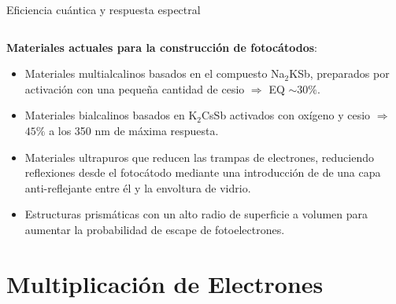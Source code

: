 \documentclass[a4paper,10pt]{beamer}
\begin{document}
\begin{frame}[allowframebreaks]{Eficiencia cuántica y respuesta espectral}
\begin{justify}
\begin{columns}[c]
  \end{columns}

  \framebreak
  
  \textbf{Materiales actuales para la construcción de fotocátodos}:
  
  \begin{itemize}
   \item \begin{justify}Materiales multialcalinos basados en el compuesto Na$_2$KSb,
   preparados por activación con una pequeña cantidad de cesio 
   $\Rightarrow$ EQ $\sim 30\%$.\end{justify}
   \item \begin{justify}Materiales bialcalinos basados en K$_2$CsSb activados con
   oxígeno y cesio $\Rightarrow$ $45\%$ a los 350 nm de máxima respuesta.\end{justify}
   \item \begin{justify}Materiales ultrapuros que reducen las trampas de electrones,
   reduciendo reflexiones desde el fotocátodo mediante una introducción
   de de una capa anti-reflejante entre él y la envoltura de vidrio.\end{justify}
   \item \begin{justify}Estructuras prismáticas con un alto radio de superficie 
   a volumen para aumentar la probabilidad de escape de fotoelectrones.\end{justify}
  \end{itemize}

  
 \end{justify}
\end{frame}

\section{Multiplicación de Electrones}
\end{document}
